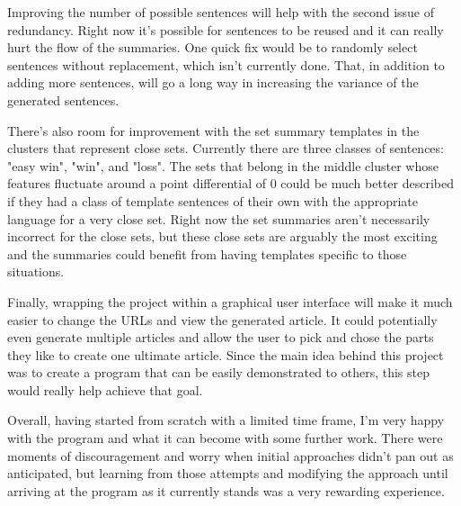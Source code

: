 \documentclass{article}
\begin{document}
Improving the number of possible sentences will help with the second issue of redundancy. Right now it's possible for sentences to be reused and it can really hurt the flow of the summaries. One quick fix would be to randomly select sentences without replacement, which isn't currently done. That, in addition to adding more sentences, will go a long way in increasing the variance of the generated sentences. 

There's also room for improvement with the set summary templates in the clusters that represent close sets. Currently there are three classes of sentences: "easy win", "win", and "loss". The sets that belong in the middle cluster whose features fluctuate around a point differential of 0 could be much better described if they had a class of template sentences of their own with the appropriate language for a very close set. Right now the set summaries aren't necessarily incorrect for the close sets, but these close sets are arguably the most exciting and the summaries could benefit from having templates specific to those situations.

Finally, wrapping the project within a graphical user interface will make it much easier to change the URLs and view the generated article. It could potentially even generate multiple articles and allow the user to pick and chose the parts they like to create one ultimate article. Since the main idea behind this project was to create a program that can be easily demonstrated to others, this step would really help achieve that goal.

Overall, having started from scratch with a limited time frame, I'm very happy with the program and what it can become with some further work. There were moments of discouragement and worry when initial approaches didn't pan out as anticipated, but learning from those attempts and modifying the approach until arriving at the program as it currently stands was a very rewarding experience. 

\nocite{survey}
\nocite{pass}



\end{document}
